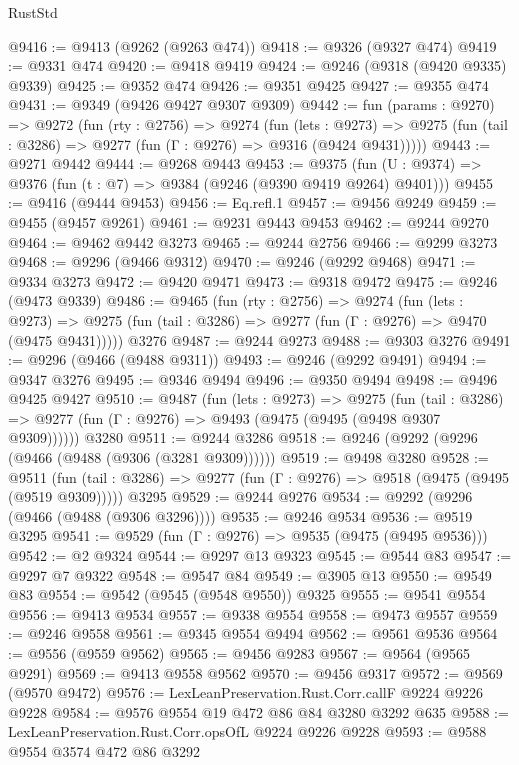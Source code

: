 \begin{lexlean}{RustStd}
\begin{coremodule}
@9416 := @9413 (@9262 (@9263 @474))
@9418 := @9326 (@9327 @474)
@9419 := @9331 @474
@9420 := @9418 @9419
@9424 := @9246 (@9318 (@9420 @9335) @9339)
@9425 := @9352 @474
@9426 := @9351 @9425
@9427 := @9355 @474
@9431 := @9349 (@9426 @9427 @9307 @9309)
@9442 := fun (params : @9270) =>
  @9272
    (fun (rty : @2756) =>
    @9274
      (fun (lets : @9273) =>
      @9275 (fun (tail : @3286) => @9277 (fun (Γ : @9276) => @9316 (@9424 @9431)))))
@9443 := @9271 @9442
@9444 := @9268 @9443
@9453 := @9375 (fun (U : @9374) => @9376 (fun (t : @7) => @9384 (@9246 (@9390 @9419 @9264) @9401)))
@9455 := @9416 (@9444 @9453)
@9456 := Eq.refl.{1}
@9457 := @9456 @9249
@9459 := @9455 (@9457 @9261)
@9461 := @9231 @9443 @9453
@9462 := @9244 @9270
@9464 := @9462 @9442 @3273
@9465 := @9244 @2756
@9466 := @9299 @3273
@9468 := @9296 (@9466 @9312)
@9470 := @9246 (@9292 @9468)
@9471 := @9334 @3273
@9472 := @9420 @9471
@9473 := @9318 @9472
@9475 := @9246 (@9473 @9339)
@9486 := @9465
    (fun (rty : @2756) =>
    @9274
      (fun (lets : @9273) =>
      @9275 (fun (tail : @3286) => @9277 (fun (Γ : @9276) => @9470 (@9475 @9431)))))
    @3276
@9487 := @9244 @9273
@9488 := @9303 @3276
@9491 := @9296 (@9466 (@9488 @9311))
@9493 := @9246 (@9292 @9491)
@9494 := @9347 @3276
@9495 := @9346 @9494
@9496 := @9350 @9494
@9498 := @9496 @9425 @9427
@9510 := @9487
    (fun (lets : @9273) =>
    @9275
      (fun (tail : @3286) => @9277 (fun (Γ : @9276) => @9493 (@9475 (@9495 (@9498 @9307 @9309))))))
    @3280
@9511 := @9244 @3286
@9518 := @9246 (@9292 (@9296 (@9466 (@9488 (@9306 (@3281 @9309))))))
@9519 := @9498 @3280
@9528 := @9511
    (fun (tail : @3286) => @9277 (fun (Γ : @9276) => @9518 (@9475 (@9495 (@9519 @9309)))))
    @3295
@9529 := @9244 @9276
@9534 := @9292 (@9296 (@9466 (@9488 (@9306 @3296))))
@9535 := @9246 @9534
@9536 := @9519 @3295
@9541 := @9529 (fun (Γ : @9276) => @9535 (@9475 (@9495 @9536)))
@9542 := @2 @9324
@9544 := @9297 @13 @9323
@9545 := @9544 @83
@9547 := @9297 @7 @9322
@9548 := @9547 @84
@9549 := @3905 @13
@9550 := @9549 @83
@9554 := @9542 (@9545 (@9548 @9550)) @9325
@9555 := @9541 @9554
@9556 := @9413 @9534
@9557 := @9338 @9554
@9558 := @9473 @9557
@9559 := @9246 @9558
@9561 := @9345 @9554 @9494
@9562 := @9561 @9536
@9564 := @9556 (@9559 @9562)
@9565 := @9456 @9283
@9567 := @9564 (@9565 @9291)
@9569 := @9413 @9558 @9562
@9570 := @9456 @9317
@9572 := @9569 (@9570 @9472)
@9576 := LexLeanPreservation.Rust.Corr.callF @9224 @9226 @9228
@9584 := @9576 @9554 @19 @472 @86 @84 @3280 @3292 @635
@9588 := LexLeanPreservation.Rust.Corr.opsOfL @9224 @9226 @9228
@9593 := @9588 @9554 @3574 @472 @86 @3292

\end{coremodule}
\end{lexlean}
